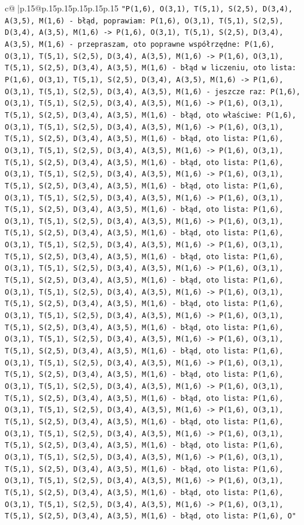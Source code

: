 \documentclass{article}
\begin{document}
{\begin{supertabular}{c@{$\;$}|p{.15\linewidth}@{}p{.15\linewidth}p{.15\linewidth}p{.15\linewidth}p{.15\linewidth}p{.15\linewidth}}
{{{\texttt{"P(1,6), O(3,1), T(5,1), S(2,5), D(3,4), A(3,5), M(1,6) {-} błąd, poprawiam: P(1,6), O(3,1), T(5,1), S(2,5), D(3,4), A(3,5), M(1,6) {-}> P(1,6), O(3,1), T(5,1), S(2,5), D(3,4), A(3,5), M(1,6) {-} przepraszam, oto poprawne współrzędne: P(1,6), O(3,1), T(5,1), S(2,5), D(3,4), A(3,5), M(1,6) {-}> P(1,6), O(3,1), T(5,1), S(2,5), D(3,4), A(3,5), M(1,6) {-} błąd w liczeniu, oto lista: P(1,6), O(3,1), T(5,1), S(2,5), D(3,4), A(3,5), M(1,6) {-}> P(1,6), O(3,1), T(5,1), S(2,5), D(3,4), A(3,5), M(1,6) {-} jeszcze raz: P(1,6), O(3,1), T(5,1), S(2,5), D(3,4), A(3,5), M(1,6) {-}> P(1,6), O(3,1), T(5,1), S(2,5), D(3,4), A(3,5), M(1,6) {-} błąd, oto właściwe: P(1,6), O(3,1), T(5,1), S(2,5), D(3,4), A(3,5), M(1,6) {-}> P(1,6), O(3,1), T(5,1), S(2,5), D(3,4), A(3,5), M(1,6) {-} błąd, oto lista: P(1,6), O(3,1), T(5,1), S(2,5), D(3,4), A(3,5), M(1,6) {-}> P(1,6), O(3,1), T(5,1), S(2,5), D(3,4), A(3,5), M(1,6) {-} błąd, oto lista: P(1,6), O(3,1), T(5,1), S(2,5), D(3,4), A(3,5), M(1,6) {-}> P(1,6), O(3,1), T(5,1), S(2,5), D(3,4), A(3,5), M(1,6) {-} błąd, oto lista: P(1,6), O(3,1), T(5,1), S(2,5), D(3,4), A(3,5), M(1,6) {-}> P(1,6), O(3,1), T(5,1), S(2,5), D(3,4), A(3,5), M(1,6) {-} błąd, oto lista: P(1,6), O(3,1), T(5,1), S(2,5), D(3,4), A(3,5), M(1,6) {-}> P(1,6), O(3,1), T(5,1), S(2,5), D(3,4), A(3,5), M(1,6) {-} błąd, oto lista: P(1,6), O(3,1), T(5,1), S(2,5), D(3,4), A(3,5), M(1,6) {-}> P(1,6), O(3,1), T(5,1), S(2,5), D(3,4), A(3,5), M(1,6) {-} błąd, oto lista: P(1,6), O(3,1), T(5,1), S(2,5), D(3,4), A(3,5), M(1,6) {-}> P(1,6), O(3,1), T(5,1), S(2,5), D(3,4), A(3,5), M(1,6) {-} błąd, oto lista: P(1,6), O(3,1), T(5,1), S(2,5), D(3,4), A(3,5), M(1,6) {-}> P(1,6), O(3,1), T(5,1), S(2,5), D(3,4), A(3,5), M(1,6) {-} błąd, oto lista: P(1,6), O(3,1), T(5,1), S(2,5), D(3,4), A(3,5), M(1,6) {-}> P(1,6), O(3,1), T(5,1), S(2,5), D(3,4), A(3,5), M(1,6) {-} błąd, oto lista: P(1,6), O(3,1), T(5,1), S(2,5), D(3,4), A(3,5), M(1,6) {-}> P(1,6), O(3,1), T(5,1), S(2,5), D(3,4), A(3,5), M(1,6) {-} błąd, oto lista: P(1,6), O(3,1), T(5,1), S(2,5), D(3,4), A(3,5), M(1,6) {-}> P(1,6), O(3,1), T(5,1), S(2,5), D(3,4), A(3,5), M(1,6) {-} błąd, oto lista: P(1,6), O(3,1), T(5,1), S(2,5), D(3,4), A(3,5), M(1,6) {-}> P(1,6), O(3,1), T(5,1), S(2,5), D(3,4), A(3,5), M(1,6) {-} błąd, oto lista: P(1,6), O(3,1), T(5,1), S(2,5), D(3,4), A(3,5), M(1,6) {-}> P(1,6), O(3,1), T(5,1), S(2,5), D(3,4), A(3,5), M(1,6) {-} błąd, oto lista: P(1,6), O(3,1), T(5,1), S(2,5), D(3,4), A(3,5), M(1,6) {-}> P(1,6), O(3,1), T(5,1), S(2,5), D(3,4), A(3,5), M(1,6) {-} błąd, oto lista: P(1,6), O(3,1), T(5,1), S(2,5), D(3,4), A(3,5), M(1,6) {-}> P(1,6), O(3,1), T(5,1), S(2,5), D(3,4), A(3,5), M(1,6) {-} błąd, oto lista: P(1,6), O(3,1), T(5,1), S(2,5), D(3,4), A(3,5), M(1,6) {-}> P(1,6), O(3,1), T(5,1), S(2,5), D(3,4), A(3,5), M(1,6) {-} błąd, oto lista: P(1,6), O(3,1), T(5,1), S(2,5), D(3,4), A(3,5), M(1,6) {-}> P(1,6), O(3,1), T(5,1), S(2,5), D(3,4), A(3,5), M(1,6) {-} błąd, oto lista: P(1,6), O"} \\
}}}
\end{supertabular}}
\end{document}
